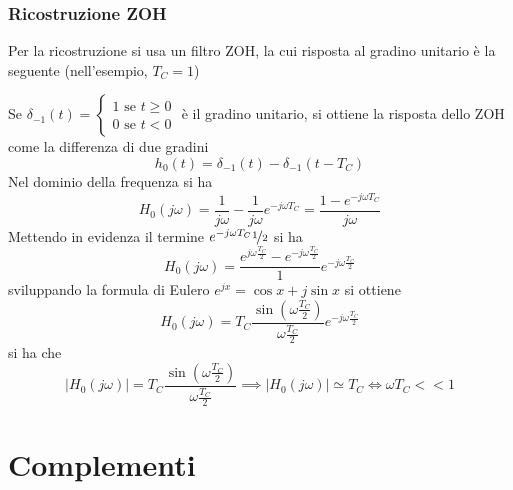 \documentclass[10pt, letterpaper]{report}
\begin{document}
\subsection{Ricostruzione ZOH}
Per la ricostruzione si usa un filtro ZOH, la cui risposta al gradino unitario è la seguente (nell'esempio, $T_C=1$)
\begin{center}
\end{center}
Se $\delta_{-1}(t)=\begin{cases}
    1 \text{ se }t\ge 0 \\ 0 \text{ se }t<0
\end{cases}$ è il gradino unitario, si ottiene la risposta dello ZOH come la differenza di due gradini 
$$ h_0(t)=\delta_{-1}(t)-\delta_{-1}(t-T_C)$$
Nel dominio della frequenza si ha 
$$H_0(j\omega)=\frac{1}{j\omega}-\frac{1}{j\omega}e^{-j\omega T_C} =\frac{1-e^{-j\omega T_C}}{j\omega}$$
Mettendo in evidenza il termine $e^{-j\omega T_C}\nicefrac{1}{2}$ si ha 
$$ H_0(j\omega)=\frac{e^{j\omega \frac{T_C}{2}}-e^{-j\omega \frac{T_C}{2}}}{1}e^{-j\omega \frac{T_C}{2}}$$
sviluppando la formula di Eulero $e^{jx}=\cos x+j\sin x$ si ottiene 
$$ H_0(j\omega)=T_C\frac{\sin(\omega \frac{T_C}{2})}{\omega \frac{T_C}{2}}e^{-j\omega \frac{T_C}{2}}$$
si ha che 
$$ 
|H_0(j\omega)|=T_C\frac{\sin(\omega \frac{T_C}{2})}{\omega \frac{T_C}{2}}\implies 
|H_0(j\omega)|\simeq T_C \iff \omega T_C<<1
$$










\chapter{Complementi}
\end{document}
